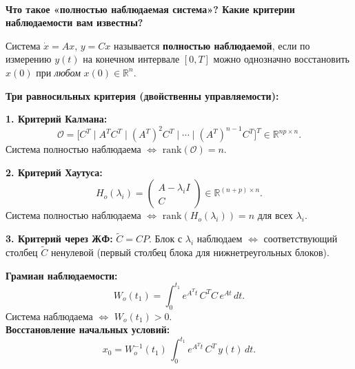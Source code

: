 \documentclass[12pt,a4paper]{article}
\begin{document}
	\begin{qblock}
		\\
		{\bfseries Что такое «полностью наблюдаемая система»? Какие критерии наблюдаемости вам известны?}
		
		\medskip
		Система $\dot{x}=Ax$, $y=Cx$ называется \textbf{полностью наблюдаемой}, если по измерению
		$y(t)$ на конечном интервале $[0,T]$ можно однозначно восстановить $x(0)$ при
		\emph{любом} $x(0) \in \mathbb{R}^n$.
		
		\medskip\noindent
		\textbf{Три равносильных критерия (двойственны управляемости):}
		
		\medskip\noindent
		\textbf{1. Критерий Калмана:}
		\[
		\mathcal{O} = \bigl[C^T \mid A^T C^T \mid (A^T)^2 C^T \mid \cdots \mid (A^T)^{n-1} C^T\bigr]^T
		\in \mathbb{R}^{np \times n}.
		\]
		Система полностью наблюдаема $\Longleftrightarrow$ $\mathrm{rank}(\mathcal{O}) = n$.
		
		\medskip\noindent
		\textbf{2. Критерий Хаутуса:}
		\[
		H_o(\lambda_i) = \begin{pmatrix} A - \lambda_i I \\ C \end{pmatrix} \in \mathbb{R}^{(n+p) \times n}.
		\]
		Система полностью наблюдаема $\Longleftrightarrow$ $\mathrm{rank}(H_o(\lambda_i)) = n$ для всех $\lambda_i$.
		
		\medskip\noindent
		\textbf{3. Критерий через ЖФ:} $\tilde{C} = CP$. Блок с $\lambda_i$ наблюдаем
		$\Longleftrightarrow$ соответствующий столбец $\tilde{C}$ ненулевой
		(первый столбец блока для нижнетреугольных блоков).
		
		\medskip\noindent
		\textbf{Грамиан наблюдаемости:}
		\[
		W_o(t_1) = \int_0^{t_1} e^{A^T t}\,C^T C\,e^{At}\,dt.
		\]
		Система наблюдаема $\Longleftrightarrow$ $W_o(t_1) > 0$.\\
		\textbf{Восстановление начальных условий:}
		\[
		x_0 = W_o^{-1}(t_1)\,\int_0^{t_1} e^{A^T t}\,C^T\,y(t)\,dt.
		\]
	\end{qblock}
	
\end{document}
